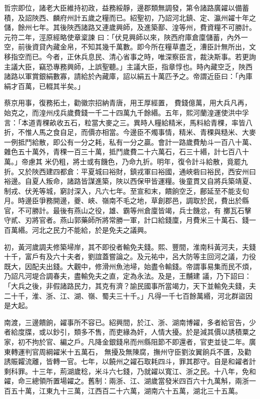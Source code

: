\begin{pinyinscope}
 哲宗即位，諸老大臣維持初政，益務綏靜，邊郡類無調發，第令諸路廣糴以備蓄積，及詔陜西、麟府州計五歲之糧而已。紹聖初，乃詔河北鎮、定、瀛州糴十年之儲，餘州七年。其後陜西諸路又連歲興師，及進築鄯、湟等州，費資糧不可勝計。元符二年，涇原經略使章楶諫
 曰：「伏見興師以來，陜西府庫倉廩儲蓄，內外一空，前後資貸內藏金帛，不知其幾千萬數。即今所在糧草盡乏，漕臣計無所出，文移指空而已。今者，正休兵息民、清心省事之時，唯深察臣言，裁決斯事。若更詢主議大臣，竊恐專務興師，上誤聖聽。」主議大臣，指章惇也。時內藏空乏，陜西諸路以軍賞銀絹數寡，請給於內藏庫，詔以絹五十萬匹予之。帝謂近臣曰：「內庫絹才百萬，已輟其半矣。」



 蔡京用事，復務拓土，勸徽宗招納青唐，用王厚經置，
 費錢億萬，用大兵凡再，始克之，而湟州戍兵歲費錢一千二十四萬九千餘緡。五年，熙河蘭湟運使洪中孚言：「本道青稞畝收五石，粒當大麥之三。異時人糧給精米，馬料給青稞，率皆八折，不惟人馬之食自足，而價亦相當。今邊臣不燭事情，精米、青稞與糙米、大麥一例抵鬥給散，即公有一分之耗，私有一分之贏。會計一路歲費觔斗一百八十萬、雜色五十萬外，青稞一百三十萬，抵鬥歲費二十六萬石，石三十緡，計七百八十萬。」帝慮其
 米仍粗，將士或有饑色，乃命九折。明年，復令計斗給散，竟罷九折。又於陜西建四都倉：平夏城曰裕財，鎮戎軍曰裕國，通峽砦曰裕民，西安州曰裕邊。自夏人叛命，諸路皆謀進築，陜以西保甲皆運糧。後童貫又自將兵築靖夏、制戎、伏羌等城，窮討深入，凡六七年。至宣和末，饋餉空乏，鄜延至不能支旬月。時邊臣爭務開邊，夔、峽、嶺南不毛之地，草創郡邑，調取於民，費出於縣官，不可勝計。最後有燕山之役，雄、霸等州倉廩皆竭，兵士饑忿，有
 擲瓦石擊守貳、刃將官者。燕山郭藥師所將常勝一軍，計口給錢廩，月費米三十萬石、錢一百萬緡。河北之民力不能給，於是免夫之議興。



 初，黃河歲調夫修築埽岸，其不即役者輸免夫錢。熙、豐間，淮南科黃河夫，夫錢十千，富戶有及六十夫者，劉誼蓋嘗論之。及元祐中，呂大防等主回河之議，力役既大，因配夫出錢。大觀中，修滑州魚池埽，始盡令輸錢。帝謂事易集而民不煩，乃詔凡河堤合調春夫，盡輸免夫之直，定為永法。及是，王黼建
 議，乃下詔曰：「大兵之後，非假諸路民力，其克有濟？諭民國事所當竭力，天下並輸免夫錢，夫二十千，淮、浙、江、湖、嶺、蜀夫三十千。」凡得一千七百餘萬緡，河北群盜因是大起。



 南渡，三邊饋餉，糴事所不容已。紹興間，於江、浙、湖南博糴，多者給官告，少者給度牒，或以鈔引，類多不售，而吏緣為奸，人情大擾。於是減其價以誘積粟之家，初不拘於官、編之戶。凡降金銀錢帛而州縣阻節不即還者，官吏並徒二年。廣東轉運判官周綱糴米十五萬石，
 無擾及無陳腐，撫州守臣劉汝翼餉兵不匱，及勸誘賑糶流離，皆轉一官。七年，以饒州之糴石取耗四斗，罪其郡守。自是和糴者計剩科罪。十三年，荊湖歲稔，米斗六七錢，乃就糴以寬江、浙之民。十八年，免和糴，命三總領所置場糴之。舊制：兩浙、江、湖歲當發米四百六十九萬斛，兩浙一百五十萬，江東九十三萬，江西百二十六萬，湖南六十五萬，湖北三十五萬。




\end{pinyinscope}
